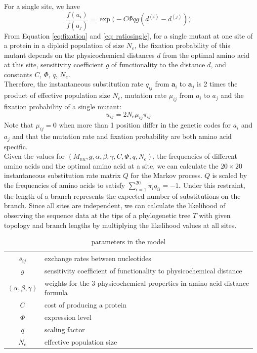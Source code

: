 \documentclass[13pt]{article}
\begin{document}
For a single site, we have 
\begin{equation}
\frac{f(a_i)}{f(a_j)} = \exp\Big(-C\Phi q g(d^{(i)}-d^{(j)})\Big)
\label{eq: ratiosingle}
\end{equation}
From Equation \ref{eq:fixation} and \ref{eq: ratiosingle}, for a single mutant at one site of a protein in a diploid population of size $N_e$, the fixation probability of this mutant depends on the physicochemical distances $d$ from the optimal amino acid at this site, sensitivity coefficient $g$ of functionality to the distance $d$, and constants $C$, $\Phi$, $q$, $N_e$.\\


Therefore, the instantaneous substitution rate $q_{ij}$ from $\mathbf{a}_i$ to $\mathbf{a}_j$ is 2 times the product of effective population size $N_e$, mutation rate $\mu_{ij}$ from $a_i$ to $a_j$ and the fixation probability of a single mutant:
\begin{equation}
u_{ij} = 2N_e \mu_{ij} \pi_{ij}
\label{eq:subrate}
\end{equation}
Note that $\mu_{ij} = 0$ when more than 1 position differ in the genetic codes for $a_i$ and $a_j$ and that the mutation rate and fixation probability are both amino acid specific. \\

Given the values for $(M_{nu},g, \alpha, \beta, \gamma, C, \Phi, q, N_e)$, the frequencies of different amino acids and the optimal amino acid at a site, we can calculate the $20 \times 20$ instantaneous substitution rate matrix $Q$ for the Markov process. $Q$ is scaled by the frequencies of amino acids to satisfy $\sum_{i=1}^{20} \pi_i q_{ii}= -1$. Under this restraint, the length of a branch represents the expected number of substitutions on the branch. Since all sites are independent, we can calculate the likelihood of observing the sequence data at the tips of a phylogenetic tree $T$ with given topology and branch lengths by multiplying the likelihood values at all sites.\\

\begin{table}[h]
\centering
\caption{parameters in the model}
\begin{tabular}{ c p{6cm} }
\hline
$s_{ij}$ & exchange rates between nucleotides\\
$g$       & sensitivity coefficient of functionality to physicochemical distance \\
$(\alpha,\beta,\gamma)$ & weights for the 3 physicochemical properties in amino acid distance formula \\
$C$ & cost of producing a protein\\
$\Phi$ & expression level \\
$q$ & scaling factor \\
$N_e$ & effective population size \\
\hline
\end{tabular}

\label{tb: para}
\end{table}
\end{document}
